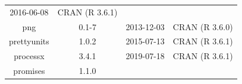 \documentclass[11pt,]{book}
\begin{document}
\begin{longtable}[]{@{}cccc@{}}
\begin{minipage}[t]{0.16\columnwidth}
2016-06-08\strut
\end{minipage} & \begin{minipage}[t]{0.36\columnwidth}\centering\strut
CRAN (R 3.6.1)\strut
\end{minipage}\tabularnewline
\begin{minipage}[t]{0.18\columnwidth}\centering\strut
png\strut
\end{minipage} & \begin{minipage}[t]{0.19\columnwidth}\centering\strut
0.1-7\strut
\end{minipage} & \begin{minipage}[t]{0.16\columnwidth}\centering\strut
2013-12-03\strut
\end{minipage} & \begin{minipage}[t]{0.36\columnwidth}\centering\strut
CRAN (R 3.6.0)\strut
\end{minipage}\tabularnewline
\begin{minipage}[t]{0.18\columnwidth}\centering\strut
prettyunits\strut
\end{minipage} & \begin{minipage}[t]{0.19\columnwidth}\centering\strut
1.0.2\strut
\end{minipage} & \begin{minipage}[t]{0.16\columnwidth}\centering\strut
2015-07-13\strut
\end{minipage} & \begin{minipage}[t]{0.36\columnwidth}\centering\strut
CRAN (R 3.6.1)\strut
\end{minipage}\tabularnewline
\begin{minipage}[t]{0.18\columnwidth}\centering\strut
processx\strut
\end{minipage} & \begin{minipage}[t]{0.19\columnwidth}\centering\strut
3.4.1\strut
\end{minipage} & \begin{minipage}[t]{0.16\columnwidth}\centering\strut
2019-07-18\strut
\end{minipage} & \begin{minipage}[t]{0.36\columnwidth}\centering\strut
CRAN (R 3.6.1)\strut
\end{minipage}\tabularnewline
\begin{minipage}[t]{0.18\columnwidth}\centering\strut
promises\strut
\end{minipage} & \begin{minipage}[t]{0.19\columnwidth}\centering\strut
1.1.0\strut
\end{minipage} & \begin{minipage}[t]{0.16\columnwidth}\centering\strut

\end{minipage}
\end{longtable}
\end{document}

